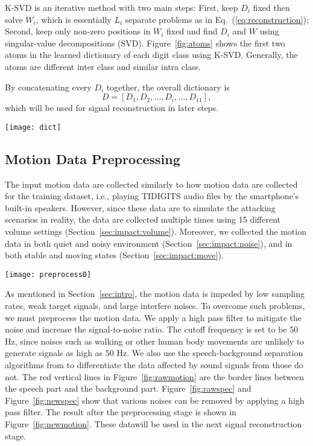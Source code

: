 K-SVD is an iterative method with two main steps: First, keep $D_i$ fixed then solve $W_i$, which is essentially $L_i$ separate problems as in Eq.~(\ref{eq:reconstruction}); Second, keep only non-zero positions in $W_i$ fixed and find $D_i$ and $W$ using singular-value decompositions (SVD). Figure~\ref{fig:atoms} shows the first two atoms in the learned dictionary of each digit class using K-SVD. Generally, the atoms are different inter class and similar intra class.

By concatenating every $D_i$ together, the overall dictionary is 
\begin{equation}
	D = \left[ D_1, D_2, \ldots, D_i, \ldots, D_{11} \right], \label{eq:dictConcat}
\end{equation}
which will be used for signal reconstruction in later steps.


\begin{figure*}[!h]
	\centering
	\texttt{[image: dict]}
	\caption{Example of Learned Dictionary Atoms. For each digit class, two different atoms are shown.}\label{fig:atoms}
\end{figure*}



\subsection{Motion Data Preprocessing}
The input motion data are collected similarly to how motion data are collected for the training dataset, i.e., playing TIDIGITS audio files by the smartphone's built-in speakers. However, since these data are to simulate the attacking scenarios in reality, the data are collected multiple times using 15 different volume settings (Section~\ref{sec:impact:volume}). Moreover, we collected the motion data in both quiet and noisy environment (Section~\ref{sec:impact:noise}), and in both stable and moving states (Section~\ref{sec:impact:move}).

\begin{figure*}[!h]
	\centering
	\texttt{[image: preprocess0]}
	\caption{The Magnitude and Phase Response of the FIR Highpass filter.}\label{fig:spyphoneresponse}
\end{figure*}


As mentioned in Section~\ref{sec:intro}, the motion data is impeded by low sampling rates, weak target signals, and large interfere noises. To overcome such problems, we must preprocess the motion data. We apply a high pass filter to mitigate the noise and increase the signal-to-noise ratio. The cutoff frequency is set to be 50 Hz, since noises such as walking or other human body movements are unlikely to generate signals as high as 50 Hz.
We also use the speech-background separation algorithms from \cite{rabiner2011theory} to differentiate the data affected by sound signals from those do not. The red vertical lines in Figure~\ref{fig:rawmotion} are the border lines between the speech part and the background part. 
Figure~\ref{fig:rawspec} and Figure~\ref{fig:newspec} show that various noises can be removed by applying a high pass filter.
The result after the preprocessing stage is shown in Figure~\ref{fig:newmotion}. These datawill be used in the next signal reconstruction stage.

